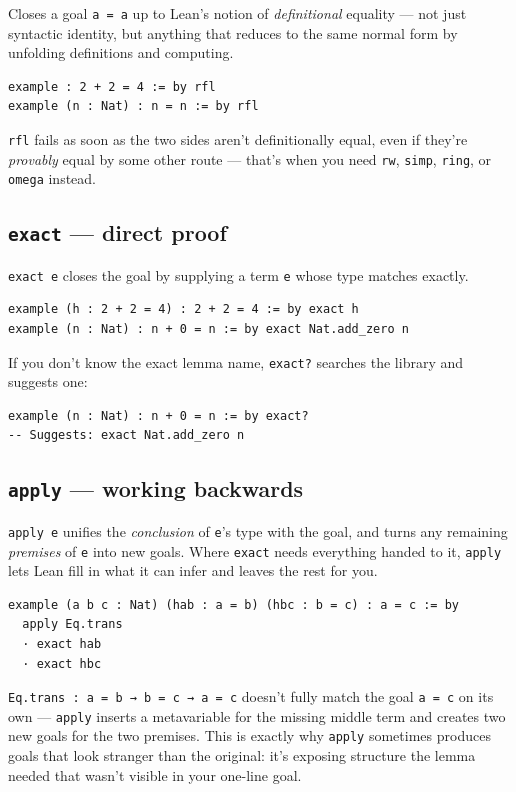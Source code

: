 Closes a goal \texttt{a = a} up to Lean's notion of \emph{definitional} equality --- not just syntactic identity, but anything that reduces to the same normal form by unfolding definitions and computing.

\begin{verbatim}
example : 2 + 2 = 4 := by rfl
example (n : Nat) : n = n := by rfl
\end{verbatim}

\texttt{rfl} fails as soon as the two sides aren't definitionally equal, even if they're \emph{provably} equal by some other route --- that's when you need \texttt{rw}, \texttt{simp}, \texttt{ring}, or \texttt{omega} instead.

\subsection{\texttt{exact} --- direct proof}

\texttt{exact e} closes the goal by supplying a term \texttt{e} whose type matches exactly.

\begin{verbatim}
example (h : 2 + 2 = 4) : 2 + 2 = 4 := by exact h
example (n : Nat) : n + 0 = n := by exact Nat.add_zero n
\end{verbatim}

If you don't know the exact lemma name, \texttt{exact?} searches the library and suggests one:

\begin{verbatim}
example (n : Nat) : n + 0 = n := by exact?
-- Suggests: exact Nat.add_zero n
\end{verbatim}

\subsection{\texttt{apply} --- working backwards}

\texttt{apply e} unifies the \emph{conclusion} of \texttt{e}'s type with the goal, and turns any remaining \emph{premises} of \texttt{e} into new goals. Where \texttt{exact} needs everything handed to it, \texttt{apply} lets Lean fill in what it can infer and leaves the rest for you.

\begin{verbatim}
example (a b c : Nat) (hab : a = b) (hbc : b = c) : a = c := by
  apply Eq.trans
  · exact hab
  · exact hbc
\end{verbatim}

\texttt{Eq.trans : a = b → b = c → a = c} doesn't fully match the goal \texttt{a = c} on its own --- \texttt{apply} inserts a metavariable for the missing middle term and creates two new goals for the two premises. This is exactly why \texttt{apply} sometimes produces goals that look stranger than the original: it's exposing structure the lemma needed that wasn't visible in your one-line goal.

